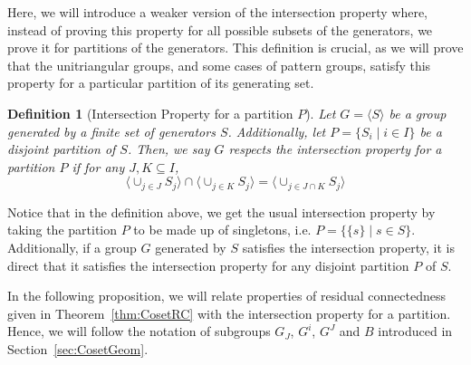 \documentclass[11pt,letterpaper]{amsart}
\newtheorem{definition}[theorem]{Definition}
\begin{document}
Here, we will introduce a weaker version of the intersection property where, instead of proving this property for all possible subsets of the generators, we prove it for partitions of the generators. This definition is crucial, as we will prove that the unitriangular groups, and some cases of pattern groups, satisfy this property for a particular partition of its generating set.

\begin{definition}[Intersection Property for a partition $P$]
Let $G=\langle S\rangle $ be a group generated by a finite set of generators $S$. Additionally, let $P=\{S_i\mid i\in I\}$ be a disjoint partition of $S$.
Then, we say $G$ respects the \emph{intersection property for a partition $P$} if for any $J,K\subseteq I$,
$$\langle \cup_{j\in J}S_j\rangle \cap \langle \cup_{j\in K}S_j\rangle = \langle \cup_{j\in J\cap K}S_j\rangle$$
\end{definition}

Notice that in the definition above, we get the usual intersection property by taking the partition $P$ to be made up of singletons, i.e. $P = \{\{s\}\mid s\in S\}$. Additionally, if a group $G$ generated by $S$ satisfies the intersection property, it is direct that it satisfies the intersection property for any disjoint partition $P$ of $S$.

In the following proposition, we will relate properties of residual connectedness given in Theorem~\ref{thm:CosetRC} with the intersection property for a partition. Hence, we will follow the notation of subgroups $G_J$, $G^i$, $G^J$ and $B$ introduced in Section~\ref{sec:CosetGeom}.
\end{document}
